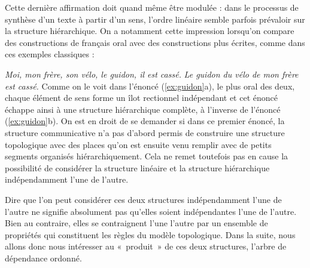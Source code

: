 {    Cette dernière affirmation doit quand même être modulée : dans le processus de synthèse d’un texte à partir d’un sens, l’ordre linéaire semble parfois prévaloir sur la structure hiérarchique. On a notamment cette impression lorsqu’on compare des constructions de français oral avec des constructions plus écrites, comme dans ces exemples classiques :

    \ea\label{ex:guidon}
    \ea  \textit{Moi, mon frère, son vélo, le guidon, il est cassé.}
    \ex  \textit{Le guidon du vélo de mon frère est cassé.}
    \z
    \z
    Comme on le voit dans l'énoncé (\ref{ex:guidon}a), le plus oral des deux, chaque élément de sens forme un îlot rectionnel indépendant et cet énoncé échappe ainsi à une structure hiérarchique complète, à l’inverse de l'énoncé (\ref{ex:guidon}b). On est en droit de se demander si dans ce premier énoncé, la structure communicative n’a pas d’abord permis de construire une structure topologique avec des places qu’on est ensuite venu remplir avec de petits segments organisés hiérarchiquement. Cela ne remet toutefois pas en cause la possibilité de considérer la structure linéaire et la structure hiérarchique indépendamment l’une de l’autre.

    Dire que l’on peut considérer ces deux structures indépendamment l’une de l’autre ne signifie absolument pas qu’elles soient indépendantes l’une de l’autre. Bien au contraire, elles se contraignent l’une l’autre par un ensemble de propriétés qui constituent les règles du modèle topologique. Dans la suite, nous allons donc nous intéresser au «~produit~» de ces deux structures, l’arbre de dépendance ordonné.
}
\pagebreak\largerpage

